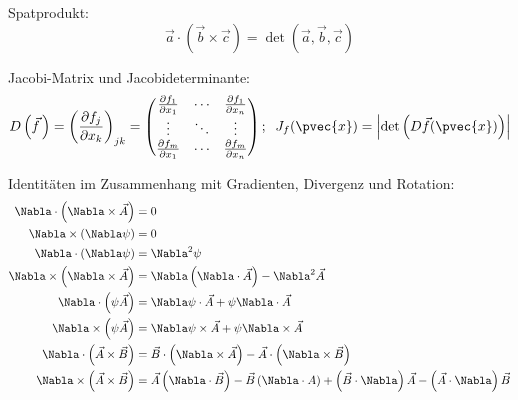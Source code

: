 \documentclass[11pt]{article}
\numberwithin{equation}{section}
\begin{document}
        Spatprodukt:
        \begin{equation}
          \vec{a}\cdot\left(\vec{b}\times\vec{c}\right) = \det\left(\vec{a},\vec{b},\vec{c}\right)
        \end{equation}

    		Jacobi-Matrix und Jacobideterminante:
    		\begin{equation}
    			D\left(\vec{f}\,\right) = \left(\frac{\partial f_j}{\partial x_k}\right)_{jk}
    			= \left(\begin{matrix}
    			\frac{\partial f_1}{\partial x_1} & \dotsb & \frac{\partial f_1}{\partial x_n} \\
    			\vdots & \ddots & \vdots \\
    			\frac{\partial f_m}{\partial x_1} & \dotsb & \frac{\partial f_m}{\partial x_n} \\
    			\end{matrix}\right);\;\;J_f(\pvec{x})=\left|\det\left(D\vec{f}(\pvec{x})\right)\right|
    		\end{equation}

        Identitäten im Zusammenhang mit Gradienten, Divergenz und Rotation:
    		\begin{equation}
          \begin{aligned}
            \Nabla\cdot\left(\Nabla\times\vec{A}\right) &= 0 \\
            \Nabla\times\left(\Nabla\psi\right) &= 0 \\
            \Nabla\cdot\left(\Nabla\psi\right) &= \Nabla^2\psi \\
            \Nabla\times\left(\Nabla\times\vec{A}\right) &= \Nabla\left(\Nabla\cdot\vec{A}\right) -\Nabla^2\vec{A} \\
            \Nabla\cdot\left(\psi\vec{A}\right) &= \Nabla\psi\cdot\vec{A} + \psi\Nabla\cdot\vec{A}\\
            \Nabla\times\left(\psi\vec{A}\right) &= \Nabla\psi\times\vec{A} + \psi\Nabla\times\vec{A} \\
            \Nabla\cdot\left(\vec{A}\times\vec{B}\right) &= \vec{B}\cdot\left(\Nabla\times\vec{A}\right) - \vec{A}\cdot\left(\Nabla\times\vec{B}\right) \\
            \Nabla\times\left(\vec{A}\times\vec{B}\right) &= \vec{A}\left(\Nabla\cdot\vec{B}\right) - \vec{B}\left(\Nabla\cdot{A}\right) + \left(\vec{B}\cdot\Nabla\right)\vec{A} - \left(\vec{A}\cdot\Nabla\right)\vec{B} \\
          \end{aligned}
    		\end{equation}
\end{document}
